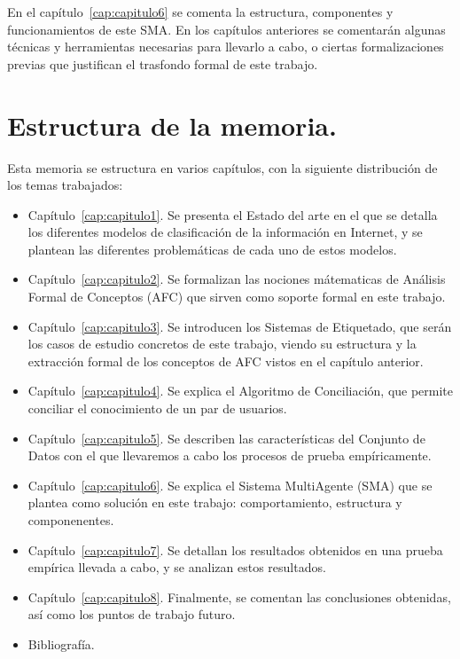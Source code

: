 En el capítulo~\ref{cap:capitulo6} se comenta la estructura, componentes y funcionamientos de este SMA. En los capítulos anteriores se comentarán algunas técnicas y herramientas necesarias para llevarlo a cabo, o ciertas formalizaciones previas que justifican el trasfondo formal de este trabajo.






\section*{Estructura de la memoria.}

Esta memoria se estructura en varios capítulos, con la siguiente distribución de los temas trabajados:

\begin{itemize}
	\item Capítulo~\ref{cap:capitulo1}. Se presenta el Estado del arte en el que se detalla los diferentes modelos de clasificación de la información en Internet, y se plantean las diferentes problemáticas de cada uno de estos modelos.
	\item Capítulo~\ref{cap:capitulo2}. Se formalizan las nociones mátematicas de Análisis Formal de Conceptos (AFC) que sirven como soporte formal en este trabajo.
	\item Capítulo~\ref{cap:capitulo3}. Se introducen los Sistemas de Etiquetado, que serán los casos de estudio concretos de este trabajo, viendo su estructura y la extracción formal de los conceptos de AFC vistos en el capítulo anterior.
	\item Capítulo~\ref{cap:capitulo4}. Se explica el Algoritmo de Conciliación, que permite conciliar el conocimiento de un par de usuarios.
	\item Capítulo~\ref{cap:capitulo5}. Se describen las características del Conjunto de Datos con el que llevaremos a cabo los procesos de prueba empíricamente.
	\item Capítulo~\ref{cap:capitulo6}. Se explica el Sistema MultiAgente (SMA) que se plantea como solución en este trabajo: comportamiento, estructura y componenentes.
	\item Capítulo~\ref{cap:capitulo7}. Se detallan los resultados obtenidos en una prueba empírica llevada a cabo, y se analizan estos resultados.
	\item Capítulo~\ref{cap:capitulo8}. Finalmente, se comentan las conclusiones obtenidas, así como los puntos de trabajo futuro.
	\item Bibliografía.
\end{itemize}